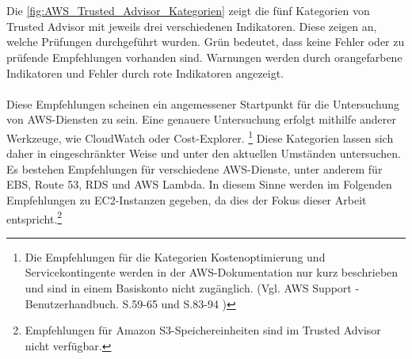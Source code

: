 \\\\
Die \autoref{fig:AWS_Trusted_Advisor_Kategorien} zeigt die fünf Kategorien von Trusted Advisor mit jeweils drei verschiedenen Indikatoren. Diese zeigen an, welche Prüfungen durchgeführt wurden. Grün bedeutet, dass keine Fehler oder zu prüfende Empfehlungen vorhanden sind. Warnungen werden durch orangefarbene Indikatoren und Fehler durch rote Indikatoren angezeigt. 
\\\\
Diese Empfehlungen scheinen ein angemessener Startpunkt für die Untersuchung von AWS-Diensten zu sein. Eine genauere Untersuchung erfolgt mithilfe anderer Werkzeuge, wie CloudWatch oder Cost-Explorer. %
\footnote{Die Empfehlungen für die Kategorien Kostenoptimierung und Servicekontingente werden in der AWS-Dokumentation nur kurz beschrieben und sind in einem Basiskonto nicht zugänglich. (Vgl. AWS Support - Benutzerhandbuch. S.59-65 und S.83-94 \cite{AMZ37})} Diese Kategorien lassen sich daher in eingeschränkter Weise und unter den aktuellen Umständen untersuchen.
%
Es bestehen Empfehlungen für verschiedene AWS-Dienste, unter anderem für EBS, Route 53, RDS und AWS Lambda. In diesem Sinne werden im Folgenden Empfehlungen zu EC2-Instanzen gegeben, da dies der Fokus dieser Arbeit entspricht.\footnote{Empfehlungen für Amazon S3-Speichereinheiten sind im Trusted Advisor nicht verfügbar.}
